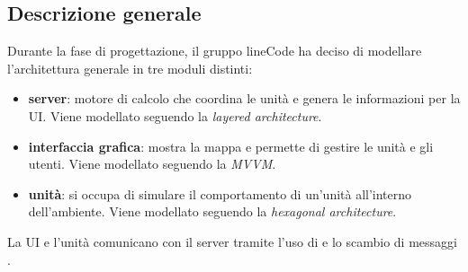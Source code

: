 \subsection{Descrizione generale}
Durante la fase di progettazione, il gruppo lineCode ha deciso di modellare l'architettura generale in tre moduli distinti:
\begin{itemize}
	\item \textbf{server}: motore di calcolo che coordina le unità e genera le informazioni per la UI. Viene modellato seguendo la \textit{layered architecture}.
	\item \textbf{interfaccia grafica}: mostra la mappa e permette di gestire le unità e gli utenti. Viene modellato seguendo la \textit{MVVM}.
	\item \textbf{unità}: si occupa di simulare il comportamento di un'unità all'interno dell'ambiente. Viene modellato seguendo la \textit{hexagonal architecture}. 
\end{itemize}
La UI e l'unità comunicano con il server tramite l'uso di  e lo scambio di messaggi .
